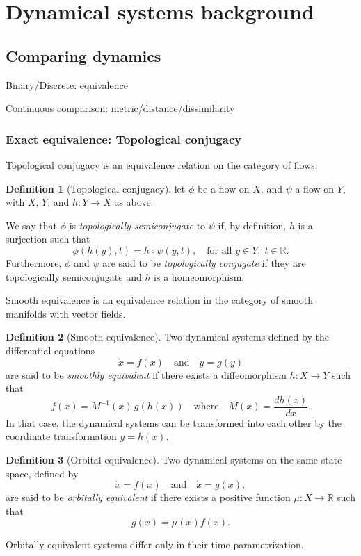 \documentclass{article}
\theoremstyle{definition} \newtheorem{definition}{Definition}  \newtheorem{example}{Example}
\theoremstyle{remark} \newtheorem{remark}{Remark}
\newcounter{ct}
\begin{document}
\newpage
\section{Dynamical systems background}

\subsection{Comparing dynamics}
Binary/Discrete: equivalence

Continuous comparison: metric/distance/dissimilarity



\subsubsection{Exact equivalence: Topological conjugacy}\label{sec:top_conj}

Topological conjugacy is an equivalence relation on the category of flows. %
\begin{definition}[Topological conjugacy]\label{def:top_conj}
let $\phi$ be a flow on $X$, and $\psi$ a flow on $Y$, with $X$, $Y$, and $h\colon Y \to X$ as above.

We say that $\phi$ is \emph{topologically semiconjugate} to $\psi$ if, by definition, $h$ is a surjection such that
\[
\phi(h(y), t) = h \circ \psi(y, t), \quad \text{for all } y \in Y, \; t \in \mathbb{R}.
\]
Furthermore, $\phi$ and $\psi$ are said to be \emph{topologically conjugate} if they are topologically semiconjugate and $h$ is a homeomorphism.
\end{definition}

Smooth equivalence is an equivalence relation in the category of smooth manifolds with vector fields. %
\begin{definition}[Smooth equivalence]\label{def:smooth_equivalence}
Two dynamical systems defined by the differential equations 
\[
\dot{x} = f(x) \quad \text{and} \quad \dot{y} = g(y)
\]
are said to be \emph{smoothly equivalent} if there exists a diffeomorphism \( h \colon X \to Y \) such that
\[
f(x) = M^{-1}(x) \, g(h(x)) \quad \text{where} \quad M(x) = \frac{d h(x)}{d x}.
\]
In that case, the dynamical systems can be transformed into each other by the coordinate transformation \( y = h(x) \).
\end{definition}

\begin{definition}[Orbital equivalence]
Two dynamical systems on the same state space, defined by 
\[
\dot{x} = f(x) \quad \text{and} \quad \dot{x} = g(x),
\]
are said to be \emph{orbitally equivalent} if there exists a positive function \( \mu \colon X \to \mathbb{R} \) such that
\[
g(x) = \mu(x) f(x).
\]
\end{definition}
Orbitally equivalent systems differ only in their time parametrization.
\end{document}
